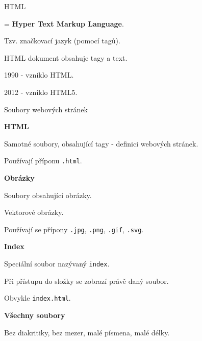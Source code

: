 \documentclass[aspectratio=1610]{beamer}
\begin{document}
\begin{frame}{HTML}
    \begin{cardTiny}
        = \textbf{Hyper Text Markup Language}.

        Tzv. značkovací jazyk (pomocí tagů).

        HTML dokument obsahuje tagy a text.

        \vspace{2ex}

        1990 - vzniklo HTML.

        2012 - vzniklo HTML5.
    \end{cardTiny}
\end{frame}

\begin{frame}{Soubory webových stránek}
    \begin{multicols}{2}
        \centering
        \begin{cardTiny}
            \textbf{HTML}

            \begin{flushleft}
            Samotné soubory, obsahující tagy - definici webových stránek. 

            Používají příponu \texttt{.html}.
            \end{flushleft}
        \end{cardTiny}
        \begin{cardTiny}
            \textbf{Obrázky}


            \begin{flushleft}
            Soubory obsahující obrázky.

            Vektorové obrázky.

            Používají se přípony \texttt{.jpg}, \texttt{.png}, \texttt{.gif},  \texttt{.svg}.
            \end{flushleft}
        \end{cardTiny}
        \begin{cardTiny}
            \textbf{Index}

            \begin{flushleft}

            Speciální soubor nazývaný \texttt{index}.

            Při přístupu do složky se zobrazí právě daný soubor.

            Obvykle \texttt{index.html}. 
            \end{flushleft}
        \end{cardTiny}
        \begin{cardTiny}
            \textbf{Všechny soubory}


            \begin{flushleft}
            Bez diakritiky, bez mezer, malé písmena, malé délky.
            \end{flushleft}
        \end{cardTiny}
    \end{multicols}
\end{frame}
\end{document}
